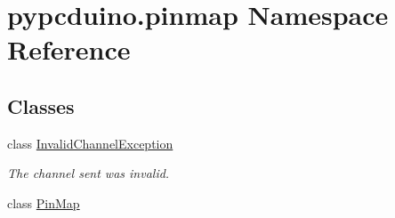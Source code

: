 \hypertarget{namespacepypcduino_1_1pinmap}{\section{pypcduino.\-pinmap Namespace Reference}
\label{namespacepypcduino_1_1pinmap}
}
\subsection*{Classes}
\begin{DoxyCompactItemize}
\item 
class \hyperlink{classpypcduino_1_1pinmap_1_1_invalid_channel_exception}{Invalid\-Channel\-Exception}
\begin{DoxyCompactList}\small\item\em The channel sent was invalid. \end{DoxyCompactList}\item 
class \hyperlink{classpypcduino_1_1pinmap_1_1_pin_map}{Pin\-Map}
\end{DoxyCompactItemize}
